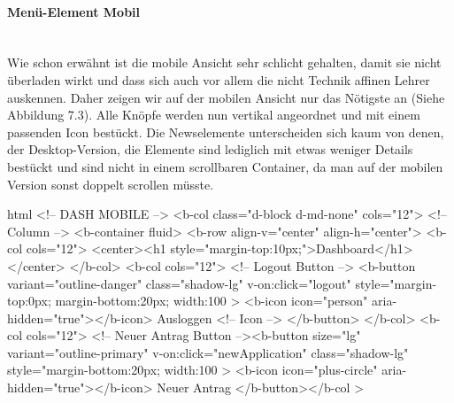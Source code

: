 \paragraph{Menü-Element Mobil}
~\\
Wie schon erwähnt ist die mobile Ansicht sehr schlicht gehalten, damit sie nicht überladen wirkt und dass sich auch vor allem die nicht Technik affinen Lehrer auskennen. Daher zeigen wir auf der mobilen Ansicht nur das Nötigste an (Siehe Abbildung 7.3). Alle Knöpfe werden nun vertikal angeordnet und mit einem passenden Icon bestückt. Die Newselemente unterscheiden sich kaum von denen, der Desktop-Version, die Elemente sind lediglich mit etwas weniger Details bestückt und sind nicht in einem scrollbaren Container, da man auf der mobilen Version sonst doppelt scrollen müsste.
\begin{code}{html}
	<!-- DASH MOBILE -->
	<b-col class="d-block d-md-none" cols="12">
	  <!-- Column -->
	  <b-container fluid>
		<b-row align-v="center" align-h="center">
		  <b-col cols="12">
			<center><h1 style="margin-top:10px;">Dashboard</h1></center>
		  </b-col>
		  <b-col cols="12">
			<!-- Logout Button -->
			<b-button
			  variant="outline-danger"
			  class="shadow-lg"
			  v-on:click="logout"
			  style="margin-top:0px; margin-bottom:20px; width:100%
			>
			  <b-icon icon="person" aria-hidden="true"></b-icon> Ausloggen
			  <!-- Icon -->
			</b-button>
		  </b-col>
		  <b-col cols="12">
			<!-- Neuer Antrag Button --><b-button
			  size="lg"
			  variant="outline-primary"
			  v-on:click="newApplication"
			  class="shadow-lg"
			  style="margin-bottom:20px; width:100%
			>
			  <b-icon icon="plus-circle" aria-hidden="true"></b-icon> Neuer
			  Antrag
			</b-button></b-col
		  >	
\end{code}

